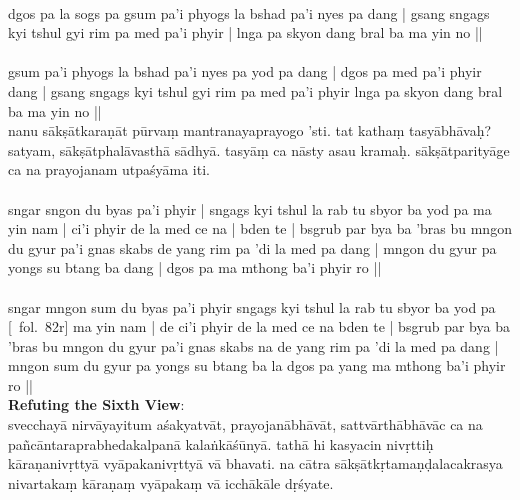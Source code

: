 \documentclass[12pt]{article}
\begin{document}
\textbf{\TVA}\\
dgos pa la sogs pa gsum pa'i phyogs la bshad pa'i nyes pa dang | gsang sngags kyi tshul gyi rim pa med pa'i phyir | lnga pa skyon dang bral ba ma yin no || \\

\textbf{\TVB}\\
gsum pa'i phyogs la bshad pa'i nyes pa yod pa dang | dgos pa med pa'i phyir dang | gsang sngags kyi tshul gyi rim pa med pa'i phyir lnga pa skyon dang bral ba ma yin no || \\

nanu sākṣātkaraṇāt pūrvaṃ mantranayaprayogo 'sti. tat kathaṃ tasyābhāvaḥ? satyam, sākṣātphalāvasthā sādhyā. tasyāṃ ca nāsty asau kramaḥ. sākṣātparityāge ca na prayojanam utpaśyāma iti.\\

\textbf{\TVA}\\
sngar sngon du byas pa'i phyir | sngags kyi tshul la rab tu sbyor ba yod pa ma yin nam | ci'i phyir de la med ce na | bden te | bsgrub par bya ba 'bras bu mngon du gyur pa'i gnas skabs de yang rim pa 'di la med pa dang | mngon du gyur pa yongs su btang ba dang | dgos pa ma mthong ba'i phyir ro ||\\

\textbf{\TVB}\\
sngar mngon sum du byas pa'i phyir sngags kyi tshul la rab tu sbyor ba yod pa [\TVB\ fol.\ 82r] ma yin nam | de ci'i phyir de la med ce na bden te | bsgrub par bya ba 'bras bu mngon du gyur pa'i gnas skabs na de yang rim pa 'di la med pa dang | mngon sum du gyur pa yongs su btang ba la dgos pa yang ma mthong ba'i phyir ro || \\

\textbf{Refuting the Sixth View}:\\
svecchayā nirvāyayitum\footnoteB{
	nirvāyayitum] \MS ; nirvāpayitum \EDD
} aśakyatvāt, prayojanābhāvāt, sattvārthābhāvāc ca na pañcāntaraprabhedakalpanā\footnoteB{
	pañcāntara] \emd\ \TIB (lnga pa'i mtha'i rab tu dbye ba); prapañcāntara° \MS\ \EDD
} kalaṅkāśūnyā. tathā hi kasyacin nivṛttiḥ kāraṇanivṛttyā vyāpakanivṛttyā\footnoteB{
	vyāpakanivṛttyā] \EDD ; vyāpakānivṛttyā \MS
} vā bhavati. na cātra sākṣātkṛtamaṇḍalacakrasya nivartakaṃ kāraṇaṃ vyāpakaṃ vā icchākāle dṛśyate.\\
\end{document}
